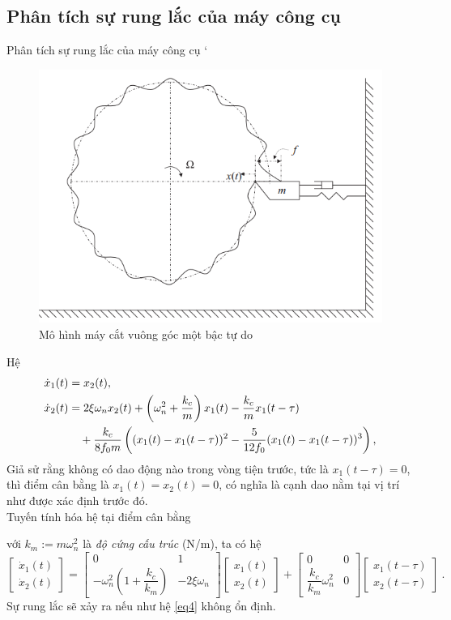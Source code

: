 \documentclass[10pt,notheorems]{beamer}
\theoremstyle{definition}
\theoremstyle{definition}
\theoremstyle{definition}
\newcommand{\m}[1]{
	\begin{bmatrix}
		#1
\end{bmatrix}}
\begin{document}
\subsection{Phân tích sự rung lắc của máy công cụ}

\begin{frame}{Phân tích sự rung lắc của máy công cụ}
`	\begin{figure}[h!]
		\centering
		\includegraphics[width=0.7\linewidth]{hinh/machine_tool_chatter}
		\caption{Mô hình máy cắt vuông góc một bậc tự do}
		\label{fig:machinetoolchatter}
	\end{figure}
\end{frame}


\begin{frame}
	Hệ
	\begin{align*}\label{turning proceess 2}
	\dot{x}_1(t) &= x_2(t), \notag \\
	\dot{x}_2(t) &= 2 \xi \omega_n {x}_2(t) + \left( \omega_n^2 + \dfrac{k_c}{m}\right) x_1(t) - \dfrac{k_c}{m} x_1(t-\tau ) \notag \\
	& \quad + \dfrac{k_c}{8 f_0 m} \left( (x_1(t) - x_1(t-\tau) )^2 - \dfrac{5}{12 f_0} (x_1(t) - x_1(t-\tau) )^3 \right),  
	\end{align*}
	Giả sử rằng không có dao động nào trong vòng tiện trước, tức là $x_1(t-\tau) = 0$, thì điểm cân bằng là $x_1(t)=x_2(t) = 0$, 
	có nghĩa là cạnh dao nằm tại vị trí như được xác định trước đó.\\
	Tuyến tính hóa hệ tại điểm cân bằng 
	
	với $k_m := m \omega_n^2$ là \emph{độ cứng cấu trúc} (N/m), ta có hệ
	\begin{equation}\label{eq4}
	\m{\dot{x}_1(t) \\ \dot{x}_2(t)} = \m{0 & 1 \\ - \omega_n^2 \left( 1 + \dfrac{k_c}{k_m}\right) & - 2 \xi \omega_n } \m{{x}_1(t) \\ {x}_2(t)} 
	+ \m{0 & 0 \\ \dfrac{k_c}{k_m}\omega_n^2 & 0 } \m{{x}_1(t-\tau) \\ {x}_2(t-\tau)} \ .
	\end{equation}
	Sự rung lắc sẽ xảy ra nếu như hệ \eqref{eq4} không ổn định.
\end{frame}
\end{document}
